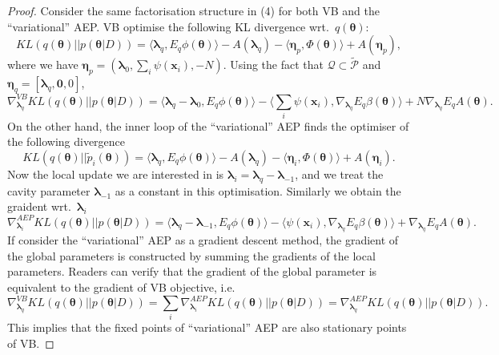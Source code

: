 \documentclass{article} %
\begin{document}
\begin{proof}
Consider the same factorisation structure in (4) for both VB and the ``variational'' AEP. VB optimise the following KL divergence wrt.~$q(\bm{\theta})$:
\begin{equation}
KL(q(\bm{\theta}) || p(\bm{\theta} | D)) = \langle \bm{\lambda}_q, E_q \phi(\bm{\theta}) \rangle - A(\bm{\lambda}_q) - \langle \bm{\eta}_p, \Phi(\bm{\theta}) \rangle + A(\bm{\eta}_p),
\end{equation}
where we have $\bm{\eta}_p = (\bm{\lambda}_0, \sum_{i} \psi(\bm{x}_i), -N)$. Using the fact that $\mathcal{Q} \subset \tilde{\mathcal{P}}$ and $\bm{\eta}_q = [\bm{\lambda}_q, \bm{0}, 0]$,
\begin{equation}
\nabla_{\bm{\lambda}_q}^{VB} KL(q(\bm{\theta}) || p(\bm{\theta} | D)) = \langle \bm{\lambda}_q - \bm{\lambda}_0, E_q \phi(\bm{\theta}) \rangle - \langle \sum_{i} \psi(\bm{x}_i), \nabla_{\bm{\lambda}_q} E_q \beta(\bm{\theta}) \rangle + N \nabla_{\bm{\lambda}_q} E_q A(\bm{\theta}).
\end{equation}
On the other hand, the inner loop of the ``variational'' AEP finds the optimiser of the following divergence
\begin{equation}
KL(q(\bm{\theta}) || \tilde{p}_i(\bm{\theta})) = \langle \bm{\lambda}_q, E_q \phi(\bm{\theta}) \rangle - A(\bm{\lambda}_q) - \langle \bm{\eta}_i, \Phi(\bm{\theta}) \rangle + A(\bm{\eta}_i).
\end{equation}
Now the local update we are interested in is $\bm{\lambda}_i = \bm{\lambda}_q - \bm{\lambda}_{-1}$, and we treat the cavity parameter $\bm{\lambda}_{-1}$ as a constant in this optimisation. Similarly we obtain the graident wrt.~$\bm{\lambda}_i$
\begin{equation}
\nabla_{\bm{\lambda}_i}^{AEP} KL(q(\bm{\theta}) || p(\bm{\theta} | D)) = \langle \bm{\lambda}_q - \bm{\lambda}_{-1}, E_q \phi(\bm{\theta}) \rangle - \langle \psi(\bm{x}_i), \nabla_{\bm{\lambda}_q} E_q \beta(\bm{\theta}) \rangle +  \nabla_{\bm{\lambda}_q} E_q A(\bm{\theta}).
\end{equation}
If consider the ``variational'' AEP as a gradient descent method, the gradient of the global parameters is constructed by summing the gradients of the local parameters. Readers can verify that the gradient of the global parameter is equivalent to the gradient of VB objective, i.e.
\begin{equation}
\nabla_{\bm{\lambda}_q}^{VB} KL(q(\bm{\theta}) || p(\bm{\theta} | D)) = \sum_i \nabla_{\bm{\lambda}_i}^{AEP} KL(q(\bm{\theta}) || p(\bm{\theta} | D)) = \nabla_{\bm{\lambda}_q}^{AEP} KL(q(\bm{\theta}) || p(\bm{\theta} | D)).
\end{equation}
This implies that the fixed points of ``variational'' AEP are also stationary points of VB.
\end{proof}
\end{document}
